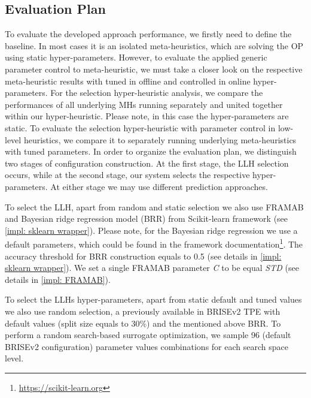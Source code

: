 \subsection{Evaluation Plan}\label{eval:1:plan}
To evaluate the developed approach performance, we firstly need to define the baseline. In most cases it is an isolated meta-heuristics, which are solving the OP using static hyper-parameters. However, to evaluate the applied generic parameter control to meta-heuristic, we must take a closer look on the respective meta-heuristic results with tuned in offline and controlled in online hyper-parameters. For the selection hyper-heuristic analysis, we compare the performances of all underlying MHs running separately and united together within our hyper-heuristic. Please note, in this case the hyper-parameters are static. To evaluate the selection hyper-heuristic with parameter control in low-level heuristics, we compare it to separately running underlying meta-heuristics with tuned parameters. In order to organize the evaluation plan, we distinguish two stages of configuration construction. At the first stage, the LLH selection occurs, while at the second stage, our system selects the respective hyper-parameters. At either stage we may use different prediction approaches. 

To select the LLH, apart from random and static selection we also use FRAMAB and Bayesian ridge regression model (BRR) from Scikit-learn framework (see \cref{impl: sklearn wrapper}). Please note, for the Bayesian ridge regression we use a default parameters, which could be found in the framework documentation\footnote{\href{https://scikit-learn.org/stable/modules/generated/sklearn.linear_model.BayesianRidge.html}{https://scikit-learn.org}}. The accuracy threshold for BRR construction equals to 0.5 (see details in \cref{impl: sklearn wrapper}). We set a single FRAMAB parameter \emph{C} to be equal \emph{STD} (see details in \cref{impl: FRAMAB}). 

To select the LLHs hyper-parameters, apart from static default and tuned values we also use random selection, a previously available in BRISEv2 TPE with default values (split size equals to 30\%) and the mentioned above BRR. To perform a random search-based surrogate optimization, we sample 96 (default BRISEv2 configuration) parameter values combinations for each search space level.

